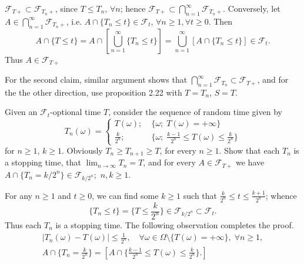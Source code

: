 \documentclass{report}
\begin{document}
\begin{prf}
	\( \mathscr{F}_{T+}\subset \mathscr{F}_{T_n+} \), since \( T\le T_n \), \( \forall n \);
	hence \( \mathscr{F}_{T+}\subset \bigcap_{n=1}^{\infty}\mathscr{F}_{T_n+} \).
	Conversely, let \( A\in \bigcap_{n=1}^{\infty}\mathscr{F}_{T_n+} \), i.e.
	\( A\cap \{ T_n\le t\}\in \mathscr{F}_t \), \( \forall n\ge1,\forall t\ge0 \).
	Then
	\[A \cap \{ T \le t \} = A \cap [ \bigcup_{n=1}^{\infty}\{T_n\le t\}]=\bigcup_{n=1}^{\infty} [ A \cap \{T_n\le t\}]\in \mathscr{F}_t.\]
	Thus \( A\in \mathscr{F}_{T+} \)
	
	For the second claim, similar argument shows that \( \bigcap_{n=1}^{\infty}\mathscr{F}_{T_n} \subset \mathscr{F}_{T+} \), and
	for the the other direction, use proposition 2.22 with \( T=T_n \), \( S=T \).
\end{prf}

\setcounter{exe}{23}
\begin{prob}
	Given an \( \mathscr{F}_t \)-optional time \( T \), consider the sequence of random time given by
	\begin{equation*}
		T_n(\omega)=\begin{cases}
			T(\omega);     & \; \{\omega ;\; T(\omega)=+\infty \}                            \\
			\frac{k}{2^n}; & \; \{\omega ;\; \frac{k-1}{2^n}\le T(\omega)\le \frac{k}{2^n}\}
		\end{cases}
	\end{equation*}
	for \( n\ge 1 \), \( k\ge 1 \).
	Obviously \( T_n \ge T_{n+1}\ge T \), for every \( n\ge1 \).
	Show that each \( T_n \) is a stopping time, that \( \lim_{n \to \infty}T_n=T \),
	and for every \( A\in \mathscr{F}_{T+} \) we have \( A \cap \{ T_n = k/{2^n}\}\in \mathscr{F}_{k/2^n}; \) \( n,k\ge1 \).
\end{prob}
\begin{prf}
	For any \( n\ge1 \) and \( t\ge0 \), we can find some \( k\ge1 \)
	such that \( \frac{k}{2^n}\le t\le \frac{k+1}{2^n} \);
	whence
	\[
		\{ T_n\le t\}=\{T\le \frac{k}{2^n}\}\in \mathscr{F}_{k/{2^n}}\subset \mathscr{F}_t.
	\]
	Thus each \( T_n \) is a stopping time. The following observation completes the proof.
	\begin{gather*}
		|T_n(\omega)-T(\omega)|\le \frac{1}{2^n},\quad \forall \omega \in \Omega \setminus \{T(\omega)=+\infty \},\;\forall n\ge1,\\
		A\cap \{T_n=\frac{k}{2^n}\}=[A \cap \{\frac{k-1}{2^n}\le T(\omega)\le \frac{k}{2^n}\}.]
	\end{gather*}
\end{prf}
\end{document}
